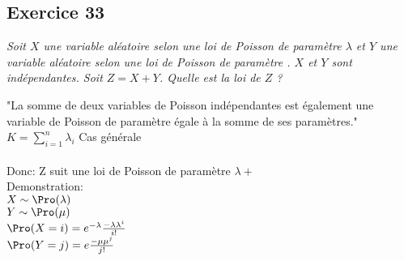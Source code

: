 \subsection*{Exercice 33}
\textit{Soit $X$ une variable aléatoire selon une loi de Poisson de paramètre $\lambda$ et $Y$ une variable aléatoire selon une loi de Poisson de paramètre \textmu{}. $X$ et $Y$ sont indépendantes. Soit $Z = X + Y$. Quelle est la loi de $Z$ ?}


"La somme de deux variables de Poisson indépendantes est également une variable de Poisson de paramètre égale à la somme de ses paramètres."\\
$K = \sum_{i=1}^n \lambda _i$        Cas générale
\\
\\
Donc: Z suit une loi de Poisson de paramètre $ \lambda + $ \textmu{}\\
Demonstration: \\
$X \sim \Pro(\lambda)$\\
$Y \sim \Pro(\mu{})$\\
$\Pro(X = i) = e^{-\lambda}\frac{-\lambda \lambda^i}{i!}$\\
$\Pro(Y = j) = e\frac{-\mu \mu^j}{j!}$\\


